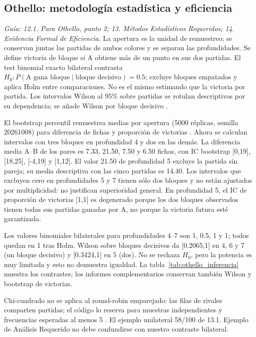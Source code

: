 \subsection{Othello: metodología estadística y eficiencia}
\textit{Guía: 12.1. Para Othello, punto 2; 13. Métodos Estadísticos Requeridos; 14. Evidencia Formal de Eficiencia.}
La apertura es la unidad de remuestreo; se conservan juntas las partidas de ambos colores y se separan las profundidades. Se define victoria de bloque si A obtiene más de un punto en sus dos partidas. El test binomial exacto bilateral contrasta $H_0:P(\text{A gana bloque}\mid\text{bloque decisivo})=0.5$; excluye bloques empatados y aplica Holm entre comparaciones. No es el mismo estimando que la victoria por partida. Los intervalos Wilson al 95\% sobre partidas se rotulan descriptivos por su dependencia; se añade Wilson por bloque decisivo \cite{wilson1927interval,othello_nist_wilson}.

El bootstrap percentil remuestrea medias por apertura (5000 réplicas, semilla 20261008) para diferencia de fichas y proporción de victorias \cite{othello_efron1979}. Ahora se calculan intervalos con tres bloques en profundidad 4 y dos en las demás. La diferencia media A--B de los pares es 7.33, 21.50, 7.50 y 6.50 fichas, con IC bootstrap [0,19], [18,25], [-4,19] y [1,12]. El valor 21.50 de profundidad 5 excluye la partida sin pareja; su media descriptiva con las cinco partidas es 14.40. Los intervalos que excluyen cero en profundidades 5 y 7 tienen sólo dos bloques y no están ajustados por multiplicidad: no justifican superioridad general. En profundidad 5, el IC de proporción de victorias [1,1] es degenerado porque los dos bloques observados tienen todas sus partidas ganadas por A, no porque la victoria futura esté garantizada.

Los valores binomiales bilaterales para profundidades 4--7 son 1, 0.5, 1 y 1; todos quedan en 1 tras Holm. Wilson sobre bloques decisivos da [0.2065,1] en 4, 6 y 7 (un bloque decisivo) y [0.3424,1] en 5 (dos). No se rechaza $H_0$, pero la potencia es muy limitada y esto no demuestra igualdad. La tabla~\ref{tab:othello_inferencia} muestra los contrastes; los informes complementarios conservan también Wilson y bootstrap de victorias.

 Chi-cuadrado no se aplica al round-robin emparejado: las filas de rivales comparten partidas; el código lo reserva para muestras independientes y frecuencias esperadas al menos 5 \cite{othello_nist_chi}. El ejemplo unilateral 58/100 de 13.1. Ejemplo de Análisis Requerido no debe confundirse con nuestro contraste bilateral.

